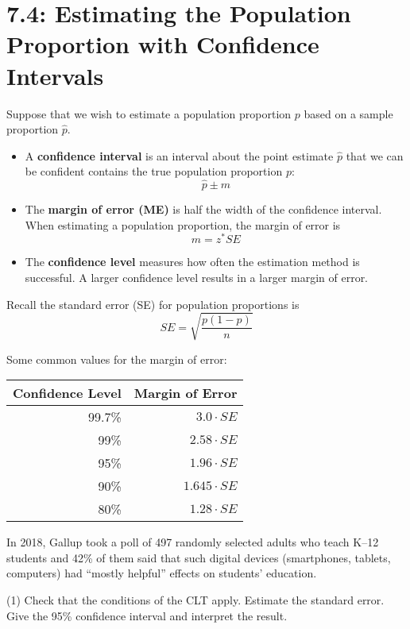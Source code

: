 \documentclass[../mathNotesPreamble]{subfiles}
\begin{document}
  \section{7.4: Estimating the Population Proportion with Confidence Intervals}
    \begin{defn*}
      Suppose that we wish to estimate a population proportion $p$ based on a sample proportion $\hat{p}$.
      \begin{itemize}
        \item A \textbf{confidence interval} is an interval about the point estimate $\hat{p}$ that we can be confident contains the true population proportion $p$:
          \[\hat{p}\pm m\]
        \item The \textbf{margin of error (ME)} is half the width of the confidence interval. When estimating a population proportion, the margin of error is
          \[m=z^* SE\]
        \item The \textbf{confidence level} measures how often the estimation method is successful. A larger confidence level results in a larger margin of error.
      \end{itemize}
    \end{defn*}
    
    Recall the standard error (SE) for population proportions is
      \[SE=\sqrt{\frac{p(1-p)}{n}}\]    
    
    \noindent
    Some common values for the margin of error:
    \begin{center}
      \begin{tabular}{@{}rr@{}}\toprule
        Confidence Level& Margin of Error\\\midrule
        99.7\%& $3.0\cdot SE$\\
        99\%& $2.58\cdot SE$\\
        95\%& $1.96\cdot SE$\\
        90\%& $1.645\cdot SE$\\
        80\%& $1.28\cdot SE$\\\bottomrule
      \end{tabular}
    \end{center}
    \pagebreak
    
    \begin{ex*}
      In 2018, Gallup took a poll of 497 randomly selected adults who teach K--12 students and 42\% of them said that such digital devices (smartphones, tablets, computers) had ``mostly helpful'' effects on students' education.
    \end{ex*}
    \begin{extasks}[after-item-skip=\stretch{1}](1)
      \task Check that the conditions of the CLT apply.
      \task Estimate the standard error.
      \task Give the 95\% confidence interval and interpret the result.
    \end{extasks}
    \pagebreak
    
\end{document}
